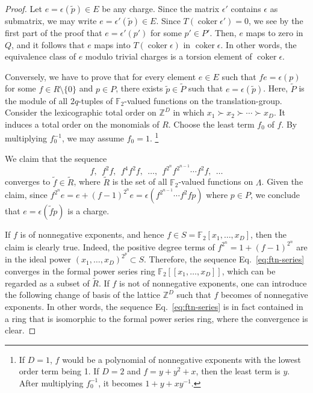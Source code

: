 \documentclass[letterpaper,12pt]{amsart}
\theoremstyle{definition} \newtheorem{defn}{Definition}
\theoremstyle{definition} \newtheorem{rem}{Remark}
\theoremstyle{definition} \newtheorem{example}{Example}
\newcommand{\coker}{\mathop{\mathrm{coker}}}
\newcommand{\FF}{\mathbb{F}}
\begin{document}
\begin{proof}
Let $e = \epsilon( \tilde p ) \in E$ be any charge.
Since the matrix $\epsilon'$ contains $\epsilon$ as submatrix,
we may write $e = \epsilon'(\tilde p) \in E$.
Since $T(\coker \epsilon')=0$,
we see by the first part of the proof that $e = \epsilon'( p' )$ for some $p' \in P'$.
Then, $e$ maps to zero in $Q$, and it follows that $e$ maps into $T(\coker \epsilon)$
in $\coker \epsilon$. 
In other words, the equivalence class of $e$ modulo trivial charges 
is a torsion element of $\coker \epsilon$.

Conversely,
we have to prove that for every element $e \in E$ 
such that $fe = \epsilon(p)$ for some $f \in R \setminus \{0\}$ and $p \in P$,
there exists $\tilde p \in \tilde P$ such that $ e = \epsilon( \tilde p )$.
Here, $\tilde P$ is the module of all $2q$-tuples of 
$\FF_2$-valued functions on the translation-group.
Consider the lexicographic total order on $\mathbb{Z}^D$ in which $x_1 \succ x_2 \succ \cdots \succ x_D$.
It induces a total order on the monomials of $R$.
Choose the least term $f_0$ of $f$.
By multiplying $f_0^{-1}$, we may assume $f_0 = 1$.%
\footnote{
If $D=1$, $f$ would be a polynomial of nonnegative exponents with the lowest order term being 1.
If $D=2$ and $f = y + y^2 + x$, then the least term is $y$.
After multiplying $f_0^{-1}$, it becomes $1+y+xy^{-1}$.
}

We claim that the sequence
\begin{equation}
 f,\ \  f^2 f,\ \  f^4 f^2 f,\ \  \ldots,\ \  f^{2^n}f^{2^{n-1}} \cdots f^2 f,\ \  \ldots
\label{eq:ftn-series}
\end{equation}
converges to $\tilde f \in \tilde R$,
where $\tilde R$ is the set of all $\FF_2$-valued functions on $\Lambda$.
Given the claim,
since $f^{2^n} e = e + (f-1)^{2^n}e = \epsilon(f^{2^{n-1}} \cdots f^2 f p)$ where $p \in P$,
we conclude that $e = \epsilon( \tilde f p )$ is a charge.

If $f$ is of nonnegative exponents, and hence $f \in S=\FF_2[x_1,\ldots,x_D]$,
then the claim is clearly true.
Indeed, the positive degree terms of $f^{2^n} = 1 + (f-1)^{2^n}$ 
are in the ideal power $(x_1,\ldots,x_D)^{2^p} \subset S$.
Therefore, the sequence Eq.~\eqref{eq:ftn-series} converges
in the formal power series ring $\FF_2[[x_1,\ldots,x_D]]$,
which can be regarded as a subset of $\tilde R$.
If $f$ is not of nonnegative exponents, one can introduce the following change of basis
of the lattice $\mathbb{Z}^D$ such that $f$ becomes of nonnegative exponents.
In other words, the sequence Eq.~\eqref{eq:ftn-series} is in fact contained in a ring 
that is isomorphic to the formal power series ring, where the convergence is clear.


\end{proof}
\end{document}
